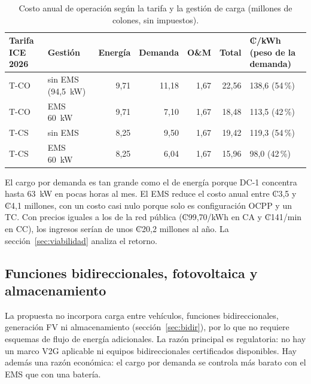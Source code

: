 \begin{table}[H]
\centering\small
\caption{Costo anual de operación según la tarifa y la gestión de carga (millones de colones, sin impuestos).}\label{tab:operacion}
\begin{tabularx}{\textwidth}{L{3.2cm}L{2.0cm}rrrrY}
\toprule
\textbf{Tarifa ICE 2026} & \textbf{Gestión} & \textbf{Energía} & \textbf{Demanda} & \textbf{O\&M} & \textbf{Total} & \textbf{₡/kWh (peso de la demanda)}\\
\midrule
T-CO & sin EMS (94,5~kW) & 9,71 & 11,18 & 1,67 & 22,56 & 138,6 (54\,\%)\\
T-CO & EMS 60~kW & 9,71 & 7,10 & 1,67 & 18,48 & 113,5 (42\,\%)\\
T-CS & sin EMS & 8,25 & 9,50 & 1,67 & 19,42 & 119,3 (54\,\%)\\
T-CS & EMS 60~kW & 8,25 & 6,04 & 1,67 & 15,96 & 98,0 (42\,\%)\\
\bottomrule
\end{tabularx}
\end{table}

El cargo por demanda es tan grande como el de energía porque DC-1 concentra hasta \SI{63}{\kilo\watt} en pocas horas al mes. El EMS reduce el costo anual entre ₡3,5 y ₡4,1 millones, con un costo casi nulo porque solo es configuración OCPP y un TC. Con precios iguales a los de la red pública (₡99,70/kWh en CA y ₡141/min en CC), los ingresos serían de unos ₡20,2 millones al año. La sección~\ref{sec:viabilidad} analiza el retorno.

\subsection{Funciones bidireccionales, fotovoltaica y almacenamiento}
La propuesta no incorpora carga entre vehículos, funciones bidireccionales, generación FV ni almacenamiento (sección~\ref{sec:bidir}), por lo que no requiere esquemas de flujo de energía adicionales. La razón principal es regulatoria: no hay un marco V2G aplicable ni equipos bidireccionales certificados disponibles. Hay además una razón económica: el cargo por demanda se controla más barato con el EMS que con una batería.

